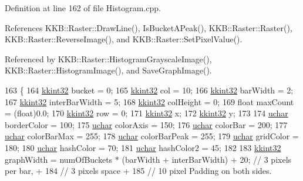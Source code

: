 Definition at line 162 of file Histogram.\+cpp.



References K\+K\+B\+::\+Raster\+::\+Draw\+Line(), Is\+Bucket\+A\+Peak(), K\+K\+B\+::\+Raster\+::\+Raster(), K\+K\+B\+::\+Raster\+::\+Reverse\+Image(), and K\+K\+B\+::\+Raster\+::\+Set\+Pixel\+Value().



Referenced by K\+K\+B\+::\+Raster\+::\+Histogram\+Grayscale\+Image(), K\+K\+B\+::\+Raster\+::\+Histogram\+Image(), and Save\+Graph\+Image().


\begin{DoxyCode}
163 \{
164   \hyperlink{namespace_k_k_b_a8fa4952cc84fda1de4bec1fbdd8d5b1b}{kkint32} bucket        = 0;
165   \hyperlink{namespace_k_k_b_a8fa4952cc84fda1de4bec1fbdd8d5b1b}{kkint32} col           = 10;
166   \hyperlink{namespace_k_k_b_a8fa4952cc84fda1de4bec1fbdd8d5b1b}{kkint32} barWidth      = 2;
167   \hyperlink{namespace_k_k_b_a8fa4952cc84fda1de4bec1fbdd8d5b1b}{kkint32} interBarWidth = 5;
168   \hyperlink{namespace_k_k_b_a8fa4952cc84fda1de4bec1fbdd8d5b1b}{kkint32} colHeight     = 0;
169   \textcolor{keywordtype}{float}   maxCount      = (float)0.0;
170   \hyperlink{namespace_k_k_b_a8fa4952cc84fda1de4bec1fbdd8d5b1b}{kkint32} row           = 0;
171   \hyperlink{namespace_k_k_b_a8fa4952cc84fda1de4bec1fbdd8d5b1b}{kkint32} x;
172   \hyperlink{namespace_k_k_b_a8fa4952cc84fda1de4bec1fbdd8d5b1b}{kkint32} y;
173 
174   \hyperlink{namespace_k_k_b_ace9969169bf514f9ee6185186949cdf7}{uchar}  borderColor  = 100;
175   \hyperlink{namespace_k_k_b_ace9969169bf514f9ee6185186949cdf7}{uchar}  colorAxis    = 150;
176   \hyperlink{namespace_k_k_b_ace9969169bf514f9ee6185186949cdf7}{uchar}  colorBar     = 200;
177   \hyperlink{namespace_k_k_b_ace9969169bf514f9ee6185186949cdf7}{uchar}  colorBarMax  = 255;
178   \hyperlink{namespace_k_k_b_ace9969169bf514f9ee6185186949cdf7}{uchar}  colorBarPeak = 255;
179   \hyperlink{namespace_k_k_b_ace9969169bf514f9ee6185186949cdf7}{uchar}  gridColor    = 180;
180   \hyperlink{namespace_k_k_b_ace9969169bf514f9ee6185186949cdf7}{uchar}  hashColor    =  70;
181   \hyperlink{namespace_k_k_b_ace9969169bf514f9ee6185186949cdf7}{uchar}  hashColor2   =  45;
182 
183   \hyperlink{namespace_k_k_b_a8fa4952cc84fda1de4bec1fbdd8d5b1b}{kkint32}  graphWidth  = numOfBuckets * (barWidth + interBarWidth) + 20; \textcolor{comment}{//  3 pixels per bar,  +}
184                                                                        \textcolor{comment}{//  3 pixels space     +}
185                                                                        \textcolor{comment}{// 10 pixel Padding on both sides.}

\end{DoxyCode}
